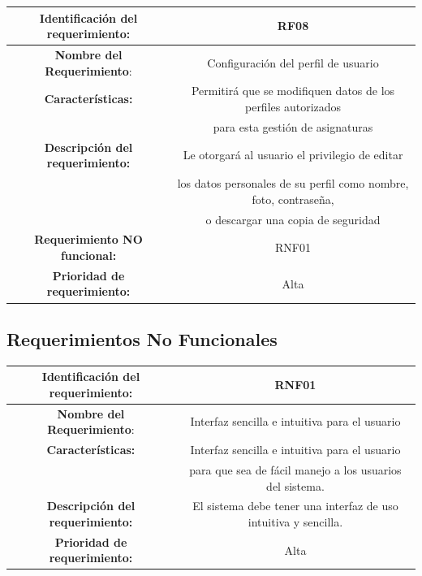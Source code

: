 \documentclass[11pt]{article}
\begin{document}
\begin{tabular}{|c|c|} 
\hline
\textbf{Identificación del requerimiento:} & RF08  \\
\hline
\textbf{Nombre del Requerimiento}: & Configuración del perfil de
usuario \\
\hline
\textbf{Características:} & Permitirá que se modifiquen datos de los 
perfiles autorizados \\ & para esta gestión de asignaturas \\
\hline
\textbf{Descripción del requerimiento:} & Le otorgará al usuario el
privilegio de editar \\ &los datos personales de su perfil como 
nombre, foto, contraseña, \\ & o descargar una copia de seguridad \\
\hline
\textbf{Requerimiento NO funcional:} & RNF01 \\
\hline
\textbf{Prioridad de requerimiento:} & Alta \\
\hline

\end{tabular}

\subsection{\textbf{Requerimientos No Funcionales}}

\vspace{15pt}

\begin{tabular}{|c|c|} 
\hline
\textbf{Identificación del requerimiento:} & RNF01  \\
\hline
\textbf{Nombre del Requerimiento}: & Interfaz sencilla e intuitiva
para el usuario \\
\hline
\textbf{Características:} & Interfaz sencilla e intuitiva para el
usuario\\ & para que sea de fácil manejo a los usuarios del sistema.
\\
\hline
\textbf{Descripción del requerimiento:} & El sistema debe tener una
interfaz de uso intuitiva y sencilla.  \\
\hline
\textbf{Prioridad de requerimiento:} & Alta \\
\hline

\end{tabular}


\vspace{15pt}
\end{document}
